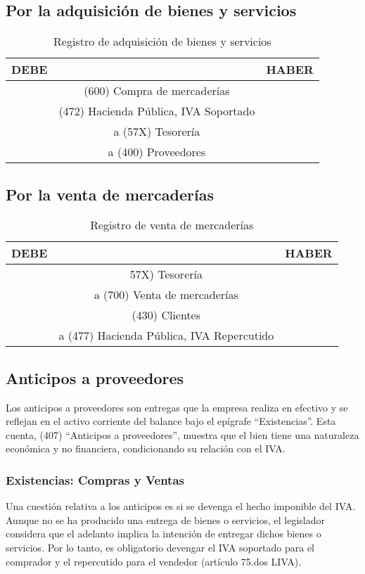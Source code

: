 \documentclass{article}
\begin{document}
\subsection*{Por la adquisición de bienes y servicios}
\begin{table}[H]
\centering
\begin{tabular}{|c|c|c|}
\hline
\textbf{DEBE} & & \textbf{HABER} \\
\hline
& (600) Compra de mercaderías & \\
\hline
& (472) Hacienda Pública, IVA Soportado & \\ 
\hline
& a (57X) Tesorería & \\
\hline
& a (400) Proveedores & \\
\hline
\end{tabular}
\caption{Registro de adquisición de bienes y servicios}
\end{table}

\subsection*{Por la venta de mercaderías}
\begin{table}[H]
\centering
\begin{tabular}{|c|c|c|}
\hline
\textbf{DEBE} & & \textbf{HABER} \\
\hline
& 57X) Tesorería & \\
\hline
& a (700) Venta de mercaderías & \\
\hline
& (430) Clientes & \\
\hline
& a (477) Hacienda Pública, IVA Repercutido & \\
\hline
\end{tabular}
\caption{Registro de venta de mercaderías}
\end{table}

\subsection{Anticipos a proveedores}

Los anticipos a proveedores son entregas que la empresa realiza en efectivo y se reflejan en el activo corriente del balance bajo el epígrafe ``Existencias''. Esta cuenta, (407) ``Anticipos a proveedores'', muestra que el bien tiene una naturaleza económica y no financiera, condicionando su relación con el IVA.

\subsubsection*{Existencias: Compras y Ventas}
Una cuestión relativa a los anticipos es si se devenga el hecho imponible del IVA. Aunque no se ha producido una entrega de bienes o servicios, el legislador considera que el adelanto implica la intención de entregar dichos bienes o servicios. Por lo tanto, es obligatorio devengar el IVA soportado para el comprador y el repercutido para el vendedor (artículo 75.dos LIVA).
\end{document}
